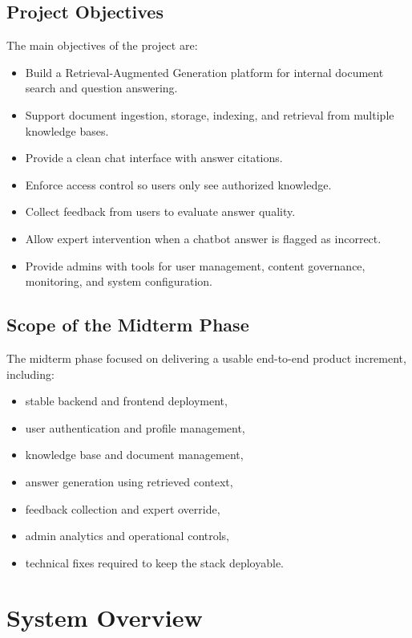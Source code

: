 \documentclass[12pt,a4paper]{report}
\begin{document}
\section{Project Objectives}

The main objectives of the project are:
\begin{itemize}[leftmargin=1.5em]
\item Build a Retrieval-Augmented Generation platform for internal document search and question answering.
\item Support document ingestion, storage, indexing, and retrieval from multiple knowledge bases.
\item Provide a clean chat interface with answer citations.
\item Enforce access control so users only see authorized knowledge.
\item Collect feedback from users to evaluate answer quality.
\item Allow expert intervention when a chatbot answer is flagged as incorrect.
\item Provide admins with tools for user management, content governance, monitoring, and system configuration.
\end{itemize}

\section{Scope of the Midterm Phase}

The midterm phase focused on delivering a usable end-to-end product increment, including:
\begin{itemize}[leftmargin=1.5em]
\item stable backend and frontend deployment,
\item user authentication and profile management,
\item knowledge base and document management,
\item answer generation using retrieved context,
\item feedback collection and expert override,
\item admin analytics and operational controls,
\item technical fixes required to keep the stack deployable.
\end{itemize}

\chapter{System Overview}
\end{document}
